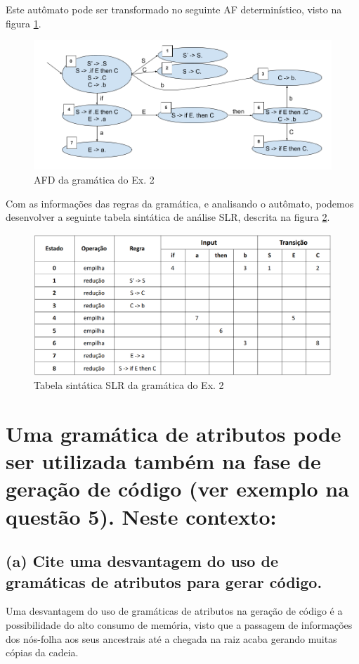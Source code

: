 \documentclass{article}
\begin{document}
Este autômato pode ser transformado no seguinte AF determinístico, visto na figura \ref{fig:AFD2}.

\begin{figure}[htb!]
	\centering
	\includegraphics[width=0.5\linewidth]{p2/AFD}
	\caption{AFD da gramática do Ex. 2}
	\label{fig:AFD2}
\end{figure}

Com as informações das regras da gramática, e analisando o autômato, podemos desenvolver a seguinte tabela sintática de análise SLR, descrita na figura \ref{fig:SLR2}.

\begin{figure}[ht!]
	\centering
	\includegraphics[width=0.7\linewidth]{p2/tabela}
	\caption{Tabela sintática SLR da gramática do Ex. 2}
	\label{fig:SLR2}
\end{figure}

\section{Uma gramática de atributos pode ser utilizada também na fase de geração de código (ver exemplo na questão 5). Neste contexto:}

\subsection{(a) Cite uma desvantagem do uso de gramáticas de atributos para gerar código. }

Uma desvantagem do uso de gramáticas de atributos na geração de código é a possibilidade do alto consumo de memória, visto que a passagem de informações dos nós-folha aos seus ancestrais até a chegada na raiz acaba gerando muitas cópias da cadeia.
\end{document}
